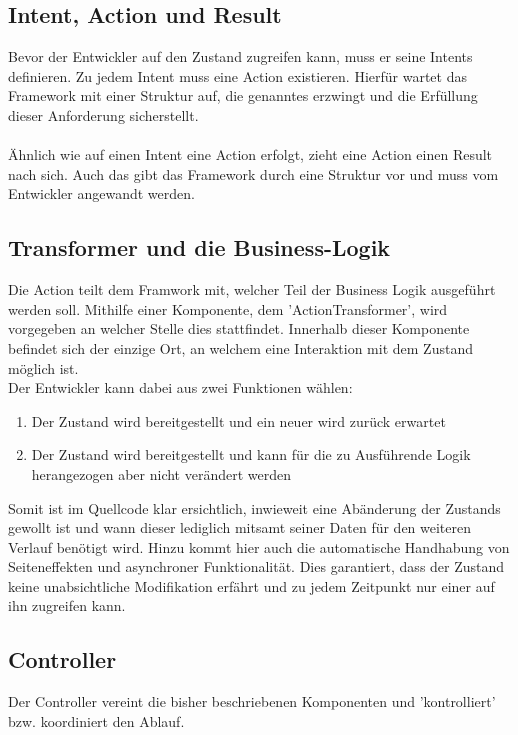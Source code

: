 \subsection{Intent, Action und Result}
Bevor der Entwickler auf den Zustand zugreifen kann, muss er seine Intents definieren. Zu jedem Intent muss eine Action existieren. Hierfür wartet das Framework mit einer Struktur auf, die genanntes erzwingt und die Erfüllung dieser Anforderung sicherstellt. 
\\
\\
Ähnlich wie auf einen Intent eine Action erfolgt, zieht eine Action einen Result nach sich. Auch das gibt das Framework durch eine Struktur vor und muss vom Entwickler angewandt werden.

\subsection{Transformer und die Business-Logik}
Die Action teilt dem Framwork mit, welcher Teil der Business Logik ausgeführt werden soll. Mithilfe einer Komponente, dem 'ActionTransformer', wird vorgegeben an welcher Stelle dies stattfindet. Innerhalb dieser Komponente befindet sich der einzige Ort, an welchem eine Interaktion mit dem Zustand möglich ist.
\\
Der Entwickler kann dabei aus zwei Funktionen wählen:
\begin{enumerate}
	\item Der Zustand wird bereitgestellt und ein neuer wird zurück erwartet
	\item Der Zustand wird bereitgestellt und kann für die zu Ausführende Logik herangezogen aber nicht verändert werden 
\end{enumerate}
\bigskip
Somit ist im Quellcode klar ersichtlich, inwieweit eine Abänderung der Zustands gewollt ist und wann dieser lediglich mitsamt seiner Daten für den weiteren Verlauf benötigt wird. Hinzu kommt hier auch die automatische Handhabung von Seiteneffekten und asynchroner Funktionalität. Dies garantiert, dass der Zustand keine unabsichtliche Modifikation erfährt und zu jedem Zeitpunkt nur einer auf ihn zugreifen kann.

\subsection{Controller}
Der Controller vereint die bisher beschriebenen Komponenten und 'kontrolliert' bzw. koordiniert den Ablauf.
